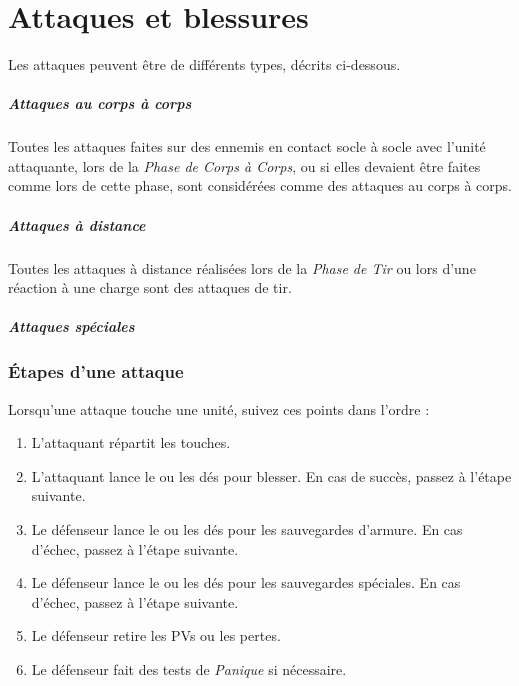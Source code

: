 
\part{Attaques et blessures}
\label{attaque_et_blessure}

Les attaques peuvent être de différents types, décrits ci-dessous.

\subsubsection*{Attaques au corps à corps}

Toutes les attaques faites sur des ennemis en contact socle à socle avec l'unité attaquante, lors de la \emph{Phase de Corps à Corps}, ou si elles devaient être faites comme lors de cette phase, sont considérées comme des attaques au corps à corps.

\subsubsection*{Attaques à distance}


Toutes les attaques à distance réalisées lors de la \emph{Phase de Tir} ou lors d'une réaction à une charge sont des attaques de tir.

\subsubsection*{Attaques spéciales}


\section{Étapes d'une attaque}

Lorsqu'une attaque touche une unité, suivez ces points dans l'ordre :
\begin{enumerate} 
\item L'attaquant répartit les touches.
\item L'attaquant lance le ou les dés pour blesser. En cas de succès, passez à l'étape suivante. 
\item Le défenseur lance le ou les dés pour les sauvegardes d'armure. En cas d'échec, passez à l'étape suivante.
\item Le défenseur lance le ou les dés pour les sauvegardes spéciales. En cas d'échec, passez à l'étape suivante.
\item Le défenseur retire les PVs ou les pertes.
\item Le défenseur fait des tests de \emph{Panique} si nécessaire.
\end{enumerate}


